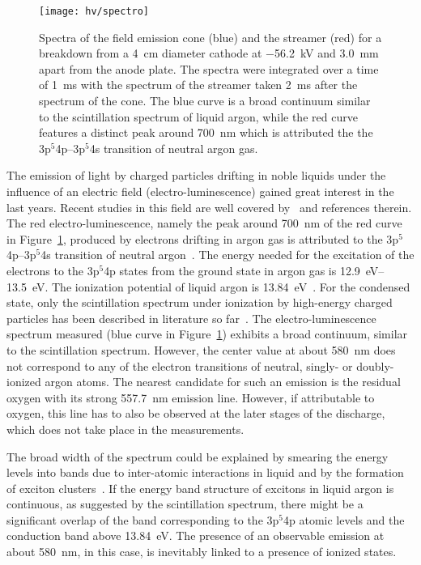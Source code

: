 \begin{figure}[htb]
	\centering
	\texttt{[image: hv/spectro]}
	\caption{Spectra of the field emission cone (blue) and the streamer (red) for a breakdown from a \SI{4}{\centi\metre} diameter cathode at \SI{-56.2}{\kilo\volt} and \SI{3.0}{\milli\metre} apart from the anode plate. The spectra were integrated over a time of \SI{1}{\milli\second} with the spectrum of the streamer taken \SI{2}{\milli\second} after the spectrum of the cone. The blue curve is a broad continuum similar to the scintillation spectrum of liquid argon, while the red curve features a distinct peak around \SI{700}{\nano\metre} which is attributed the the 3p$^5$4p--3p$^5$4s transition of neutral argon gas.}
	\label{fig:hv_spectro}
\end{figure}

The emission of light by charged particles drifting in noble liquids under the influence of an electric field (electro-luminescence) gained great interest in the last years.
Recent studies in this field are well covered by~\cite{buzulutskov1, buzulutskov2, buzulutskov3} and references therein.
The red electro-luminescence, namely the peak around \SI{700}{\nano\metre} of the red curve in Figure~\ref{fig:hv_spectro}, produced by electrons drifting in argon gas is attributed to the 3p$^5$4p--3p$^5$4s transition of neutral argon~\cite{Boffard}.
The energy needed for the excitation of the electrons to the 3p$^5$4p states from the ground state in argon gas is \SIrange{12.9}{13.5}{\electronvolt}.
The ionization potential of liquid argon is \SI{13.84}{\electronvolt}~\cite{2photonAbs}.
For the condensed state, only the scintillation spectrum under ionization by high-energy charged particles has been described in literature so far~\cite{Heindl}.
The electro-luminescence spectrum measured (blue curve in Figure~\ref{fig:hv_spectro}) exhibits a broad continuum, similar to the scintillation spectrum.
However, the center value at about \SI{580}{\nano\metre} does not correspond to any of the electron transitions of neutral, singly- or doubly-ionized argon atoms.
The nearest candidate for such an emission is the residual oxygen with its strong \SI{557.7}{\nano\metre} emission line.
However, if attributable to oxygen, this line has to also be observed at the later stages of the discharge, which does not take place in the measurements.

The broad width of the spectrum could be explained by smearing the energy levels into bands due to inter-atomic interactions in liquid and by the formation of exciton clusters~\cite{Bernstorff, Foerstel}.
If the energy band structure of excitons in liquid argon is continuous, as suggested by the scintillation spectrum, there might be a significant overlap of the band corresponding to the 3p$^5$4p atomic levels and the conduction band above \SI{13.84}{\electronvolt}.
The presence of an observable emission at about \SI{580}{\nano\metre}, in this case, is inevitably linked to a presence of ionized states.

